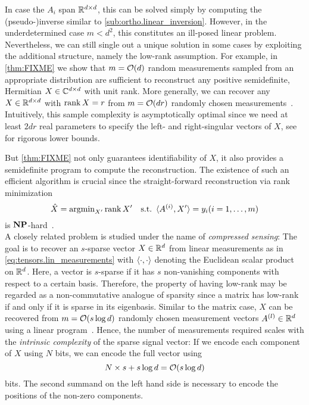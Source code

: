 In case the $A_i$ span ${\mathbb{R}}^{d \times d}$, this can be solved simply by computing the (pseudo-)inverse similar to \cref{sub:ortho.linear_inversion}.
However, in the underdetermined case $m < d^{2}$, this constitutes an ill-posed linear problem.
Nevertheless, we can still single out a unique solution in some cases by exploiting the additional structure, namely the low-rank assumption.
For example, in \cref{thm:FIXME} we show that $m = {\mathcal{O}}(d)$ random measurements sampled from an appropriate distribution are sufficient to reconstruct any positive semidefinite, Hermitian $X \in {\mathbb{C}}^{d \times d}$ with unit rank.
More generally, we can recover any $X \in {\mathbb{R}}^{d \times d}$ with $\operatorname{rank} X = r$ from $m = {\mathcal{O}}(d r)$ randomly chosen measurements~\cite{Candes_2011_Tight,Kueng_2014_Low}.
Intuitively, this sample complexity is asymptotically optimal since we need at least $2 d r$ real parameters to specify the left- and right-singular vectors of $X$, see~\cite{Eldar_2012_Uniqueness,Li_2017_Optimal} for rigorous lower bounds.

But \cref{thm:FIXME} not only guarantees identifiability of $X$, it also provides a semidefinite program to compute the reconstruction.
The existence of such an efficient algorithm is crucial since the straight-forward reconstruction via rank minimization
\[
  \hat{X} = \operatorname{argmin}_{X'} \operatorname{rank} X' \quad\mathrm{s.t.}\ \braket{A^{(i)}, X'} = y_i (i = 1, \ldots, m)
\]
is $\mathbf{NP}$-hard~\cite{Mesbahi}.\\

A closely related problem is studied under the name of \emph{compressed sensing}:
The goal is to recover an $s$-sparse vector $X \in {\mathbb{R}}^d$ from linear measurements as in \cref{eq:tensors.lin_measurements} with $\braket{\cdot, \cdot}$ denoting the Euclidean scalar product on ${\mathbb{R}}^d$.
Here, a vector is $s$-sparse if it has $s$ non-vanishing components with respect to a certain basis.
Therefore, the property of having low-rank may be regarded as a non-commutative analogue of sparsity since a matrix has low-rank if and only if it is sparse in its eigenbasis.
Similar to the matrix case, $X$ can be recovered from $m = {\mathcal{O}}(s \log d)$ randomly chosen measurement vectors $A^{(l)} \in {\mathbb{R}}^d$ using a linear program~\cite{Foucart_2013_Mathematical}.
Hence, the number of measurements required scales with the \emph{intrinsic complexity} of the sparse signal vector:
If we encode each component of $X$ using $N$ bits, we can encode the full vector using
\[
  N \times s + s \log d = {\mathcal{O}}(s \log d)
\]
bits.
The second summand on the left hand side is necessary to encode the positions of the non-zero components.

